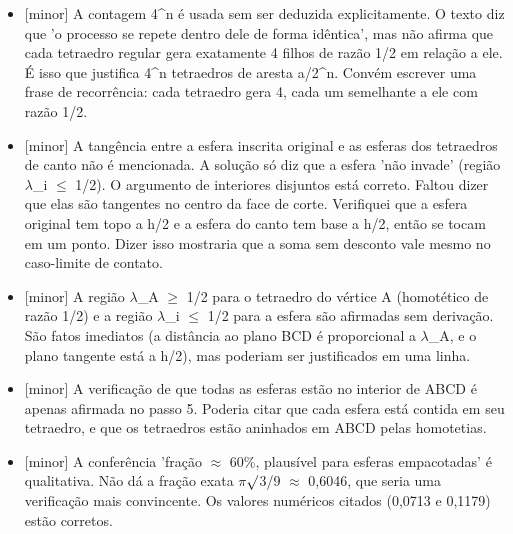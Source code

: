 \documentclass{article}%
\begin{document}
\begin{itemize}%
\item%
{[}minor{]} A contagem 4\^{}n é usada sem ser deduzida explicitamente. O texto diz que 'o processo se repete dentro dele de forma idêntica', mas não afirma que cada tetraedro regular gera exatamente 4 filhos de razão 1/2 em relação a ele. É isso que justifica 4\^{}n tetraedros de aresta a/2\^{}n. Convém escrever uma frase de recorrência: cada tetraedro gera 4, cada um semelhante a ele com razão 1/2.%
\item%
{[}minor{]} A tangência entre a esfera inscrita original e as esferas dos tetraedros de canto não é mencionada. A solução só diz que a esfera 'não invade' (região $\lambda$\_i $\leq$ 1/2). O argumento de interiores disjuntos está correto. Faltou dizer que elas são tangentes no centro da face de corte. Verifiquei que a esfera original tem topo a h/2 e a esfera do canto tem base a h/2, então se tocam em um ponto. Dizer isso mostraria que a soma sem desconto vale mesmo no caso{-}limite de contato.%
\item%
{[}minor{]} A região $\lambda$\_A $\geq$ 1/2 para o tetraedro do vértice A (homotético de razão 1/2) e a região $\lambda$\_i $\leq$ 1/2 para a esfera são afirmadas sem derivação. São fatos imediatos (a distância ao plano BCD é proporcional a $\lambda$\_A, e o plano tangente está a h/2), mas poderiam ser justificados em uma linha.%
\item%
{[}minor{]} A verificação de que todas as esferas estão no interior de ABCD é apenas afirmada no passo 5. Poderia citar que cada esfera está contida em seu tetraedro, e que os tetraedros estão aninhados em ABCD pelas homotetias.%
\item%
{[}minor{]} A conferência 'fração $\approx$ 60\%, plausível para esferas empacotadas' é qualitativa. Não dá a fração exata $\pi$$\surd$3/9 $\approx$ 0,6046, que seria uma verificação mais convincente. Os valores numéricos citados (0,0713 e 0,1179) estão corretos.%
\end{itemize}%
\end{document}
